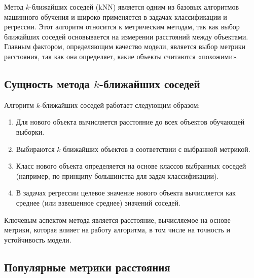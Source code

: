 Метод \(k\)-ближайших соседей (kNN) является одним из базовых алгоритмов машинного обучения и широко применяется в задачах классификации и регрессии. Этот алгоритм относится к метрическим методам, так как выбор ближайших соседей основывается на измерении расстояний между объектами. Главным фактором, определяющим качество модели, является выбор метрики расстояния, так как она определяет, какие объекты считаются «похожими».

\subsection{Сущность метода \(k\)-ближайших соседей}

Алгоритм \(k\)-ближайших соседей работает следующим образом:
\begin{enumerate}
    \item Для нового объекта вычисляется расстояние до всех объектов обучающей выборки.
    \item Выбираются \(k\) ближайших объектов в соответствии с выбранной метрикой.
    \item Класс нового объекта определяется на основе классов выбранных соседей (например, по принципу большинства для задач классификации).
    \item В задачах регрессии целевое значение нового объекта вычисляется как среднее (или взвешенное среднее) значений соседей.
\end{enumerate}

Ключевым аспектом метода является расстояние, вычисляемое на основе метрики, которая влияет на работу алгоритма, в том числе на точность и устойчивость модели.

\subsection{Популярные метрики расстояния}

